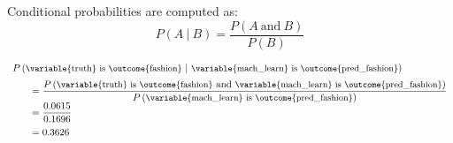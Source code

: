 \documentclass{beamer}
\newcommand{\prob}[1]{P\left({#1}\right)}
\newcommand{\jointprob}[3]{\prob{{#1}~\text{#2}~{#3}}}
\newcommand{\condprob}[2]{\prob{{#1}~|~{#2}}}
\begin{document}
\begin{frame}
\begin{note}
Conditional probabilities are computed as:
\begin{equation*}
\condprob{A}{B} = \dfrac{\jointprob{A}{and}{B}}{\prob{B}}
\end{equation*}
\end{note}\pause

\begin{example}
\begin{equation*}
\begin{array}{l}
\condprob{\text{\small\variable{truth} is \outcome{fashion}}}{\text{\small\variable{mach\_learn} is \outcome{pred\_fashion}}}\\[2mm]
\qquad= \dfrac{\jointprob{\text{\small\variable{truth} is \outcome{fashion}}}{and}{\text{\small\variable{mach\_learn} is \outcome{pred\_fashion}}}}{\prob{\text{\small\variable{mach\_learn} is \outcome{pred\_fashion}}}}\\[2mm]
\qquad=\dfrac{0.0615}{0.1696} \\[3mm]
\qquad= 0.3626
\end{array}
\end{equation*}
\end{example}
\end{frame}
\end{document}

